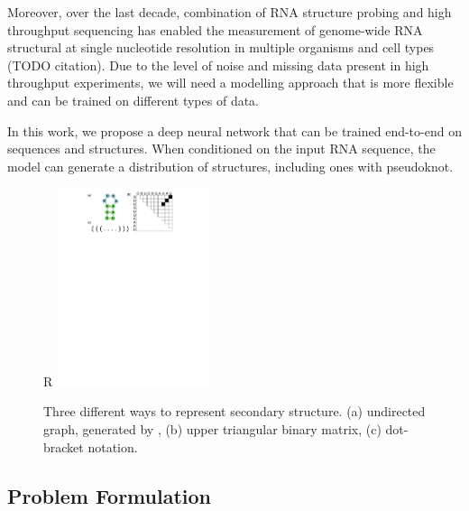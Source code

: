 \documentclass{article}
\begin{document}
Moreover, over the last decade,
combination of RNA structure probing and high throughput sequencing has enabled
the measurement of genome-wide RNA structural at single nucleotide resolution in multiple organisms and cell types (TODO citation).
Due to the level of noise and missing data present in high throughput experiments,
we will need a modelling approach that is more flexible and can be trained on different types of data.
%

In this work, we propose a deep neural network that can be trained end-to-end on
sequences and structures. When conditioned on the input RNA sequence,
the model can generate a distribution of structures, including ones with pseudoknot.

%
%

\begin{figure}{R}
        \centering
        \includegraphics[width=0.4\textwidth]{plot/rna_ss_binary_mat.pdf}
        \caption{Three different ways to represent secondary structure. (a) undirected graph, generated by \cite{kerpedjiev2015forna}, (b) upper triangular binary matrix, (c) dot-bracket notation.}
        \label{fig:rna_ss_binary_mat}
        \centering
\end{figure}

\subsection{Problem Formulation}
\end{document}
